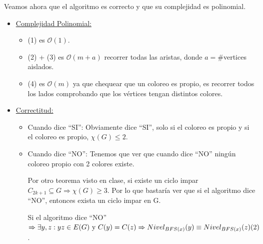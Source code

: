 \documentclass[12pt,a4paper]{report}
\begin{document}
			\par Veamos ahora que el algoritmo es correcto y que su complejidad es polinomial.
			\begin{itemize}
				\item \underline{Complejidad Polinomial:}
					\begin{itemize}
						\item (1) es $\mathcal{O}(1)$.
						\item (2) + (3) es $\mathcal{O}(m + a)$ recorrer todas las aristas, donde $a = \#$vertices aislados.
						\item (4) es $\mathcal{O}(m)$ ya que chequear que un coloreo es propio, es recorrer todos los lados comprobando que los vértices tengan distintos colores.
					\end{itemize}
				\item \underline{Correctitud:}
					\begin{itemize}
						\item Cuando dice \textquotedblleft SI\textquotedblright: Obviamente dice \textquotedblleft SI\textquotedblright, solo si el coloreo es propio y si el coloreo es propio, $\chi(G) \leq 2$.
						\item Cuando dice \textquotedblleft NO\textquotedblright: Tenemos que ver que cuando dice \textquotedblleft NO\textquotedblright \; ningún coloreo propio con 2 colores existe.

							\vspace{5mm}
							\par Por otro teorema visto en clase, si existe un ciclo impar $C_{2k + 1} \subseteq G \Rightarrow \chi(G) \geq 3$. Por lo que bastaría ver que si el algoritmo dice \textquotedblleft NO\textquotedblright, entonces exista un ciclo impar en G.

							\vspace{5mm}
							\par Si el algoritmo dice \textquotedblleft NO\textquotedblright $\Rightarrow \exists y, z : yz \in E(G) \textup{ y } C(y) = C(z) \Rightarrow Nivel_{BFS(x)}(y) \equiv Nivel_{BFS(x)}(z) (2)$.


\end{itemize}
\end{itemize}
\end{document}
